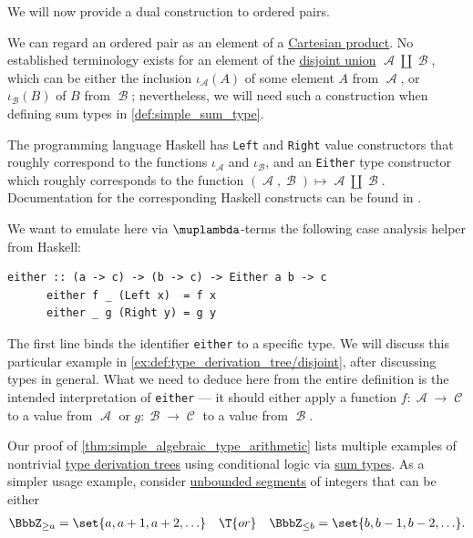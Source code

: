 \begin{example}
\begin{thmenum}
     We will now provide a dual construction to ordered pairs.

    We can regard an ordered pair as an element of a \hyperref[def:cartesian_product]{Cartesian product}. No established terminology exists for an element of the \hyperref[def:disjoint_union]{disjoint union} \( \mscrA \amalg \mscrB \), which can be either the inclusion \( \iota_\mscrA(A) \) of some element \( A \) from \( \mscrA \), or \( \iota_\mscrB(B) \) of \( B \) from \( \mscrB \); nevertheless, we will need such a construction when defining sum types in \cref{def:simple_sum_type}.

    The programming language Haskell has \Verb|Left| and \Verb|Right| value constructors that roughly correspond to the functions \( \iota_\mscrA \) and \( \iota_\mscrB \), and an \Verb|Either| type constructor which roughly corresponds to the function \( (\mscrA, \mscrB) \mapsto \mscrA \amalg \mscrB \). Documentation for the corresponding Haskell constructs can be found in \cite{HackageDocs:base-4.22:either}.

    We want to emulate here via \( \muplambda \)-terms the following case analysis helper from Haskell:
    \begin{Verbatim}[gobble=4]
      either :: (a -> c) -> (b -> c) -> Either a b -> c
      either f _ (Left x)  = f x
      either _ g (Right y) = g y
    \end{Verbatim}

    The first line binds the identifier \Verb|either| to a specific type. We will discuss this particular example in \cref{ex:def:type_derivation_tree/disjoint}, after discussing types in general. What we need to deduce here from the entire definition is the intended interpretation of \Verb|either| --- it should either apply a function \( f: \mscrA \to \mscrC \) to a value from \( \mscrA \) or \( g: \mscrB \to \mscrC \) to a value from \( \mscrB \).

    Our proof of \cref{thm:simple_algebraic_type_arithmetic} lists multiple examples of nontrivial \hyperref[def:type_derivation_tree]{type derivation trees} using conditional logic via \hyperref[def:simple_sum_type]{sum types}. As a simpler usage example, consider \hyperref[def:order_interval/unbounded]{unbounded segments} of integers that can be either
    \begin{align*}
      \BbbZ_{\geq a} = \set{ a, a + 1, a + 2, \ldots }
      &&\T{or}&&
      \BbbZ_{\leq b} = \set{ b, b - 1, b - 2, \ldots }.
    \end{align*}


\end{thmenum}
\end{example}
